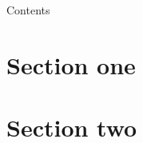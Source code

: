 \documentclass[fontset=none]{ctexbeamer}
\begin{document}
\begin{frame}
  \titlepage
\end{frame}

\begin{frame}{Contents}
  \tableofcontents
\end{frame}

\section{Section one}%
\label{sec:section_1}


\section{Section two}%

\label{sec:section_2}
\end{document}
